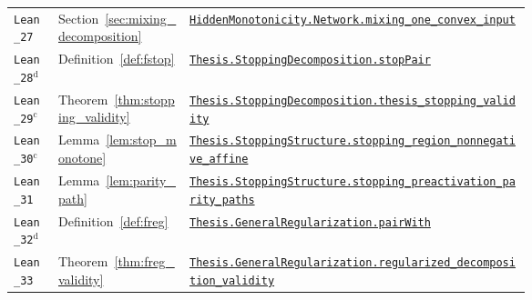 {\begin{longtable}{@{}l l >{\raggedright\arraybackslash}p{0.66\linewidth}@{}}
\texttt{Lean\_27} & Section~\ref{sec:mixing_decomposition} & \href{https://github.com/JayPiZimmermann/A-Structural-Approach-to-Explainable-Deep-Learning/blob/b1c18a7ed02eadd720b0b693794ba7e7dd2628f6/formalization/HiddenMonotonicity/ConvexInput.lean\#L81}{\texttt{HiddenMonotonicity.\allowbreak Network.\allowbreak mixing\_one\_convex\_input}} \\
\texttt{Lean\_28}$^{\mathrm d}$ & Definition~\ref{def:fstop} & \href{https://github.com/JayPiZimmermann/A-Structural-Approach-to-Explainable-Deep-Learning/blob/b1c18a7ed02eadd720b0b693794ba7e7dd2628f6/formalization/Thesis/StoppingDecomposition.lean\#L13}{\texttt{Thesis.\allowbreak StoppingDecomposition.\allowbreak stopPair}} \\
\texttt{Lean\_29}$^{\mathrm c}$ & Theorem~\ref{thm:stopping_validity} & \href{https://github.com/JayPiZimmermann/A-Structural-Approach-to-Explainable-Deep-Learning/blob/b1c18a7ed02eadd720b0b693794ba7e7dd2628f6/formalization/Thesis/StoppingDecomposition.lean\#L29}{\texttt{Thesis.\allowbreak StoppingDecomposition.\allowbreak thesis\_stopping\_validity}} \\
\texttt{Lean\_30}$^{\mathrm c}$ & Lemma~\ref{lem:stop_monotone} & \href{https://github.com/JayPiZimmermann/A-Structural-Approach-to-Explainable-Deep-Learning/blob/b1c18a7ed02eadd720b0b693794ba7e7dd2628f6/formalization/Thesis/StoppingRegions.lean\#L183}{\texttt{Thesis.\allowbreak StoppingStructure.\allowbreak stopping\_region\_nonnegative\_affine}} \\
\texttt{Lean\_31} & Lemma~\ref{lem:parity_path} & \href{https://github.com/JayPiZimmermann/A-Structural-Approach-to-Explainable-Deep-Learning/blob/b1c18a7ed02eadd720b0b693794ba7e7dd2628f6/formalization/Thesis/StoppingPaths.lean\#L182}{\texttt{Thesis.\allowbreak StoppingStructure.\allowbreak stopping\_preactivation\_parity\_paths}} \\
\texttt{Lean\_32}$^{\mathrm d}$ & Definition~\ref{def:freg} & \href{https://github.com/JayPiZimmermann/A-Structural-Approach-to-Explainable-Deep-Learning/blob/b1c18a7ed02eadd720b0b693794ba7e7dd2628f6/formalization/Thesis/GeneralRegularization.lean\#L135}{\texttt{Thesis.\allowbreak GeneralRegularization.\allowbreak pairWith}} \\
\texttt{Lean\_33} & Theorem~\ref{thm:freg_validity} & \href{https://github.com/JayPiZimmermann/A-Structural-Approach-to-Explainable-Deep-Learning/blob/b1c18a7ed02eadd720b0b693794ba7e7dd2628f6/formalization/Thesis/GeneralRegularization.lean\#L249}{\texttt{Thesis.\allowbreak GeneralRegularization.\allowbreak regularized\_decomposition\_validity}} \\

\end{longtable}}
